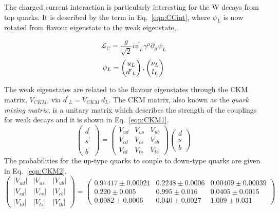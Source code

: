 The charged current interaction is particularly interesting for the W decays from top quarks. It is described by the term in Eq.~\ref{eqn:CCint}, where $\psi_L$ is now rotated from flavour eigenstate to the weak eigenstate,.

\begin{equation}
\label{eqn:CCint}
\mathcal{L}_{C} = \frac{g}{\sqrt{2}} i\bar{\psi_{L}} \gamma^{\mu} \partial_{\mu} \psi_{L}
\end{equation}
\begin{equation*}
\psi_L = \begin{pmatrix} u_L \\ {d'}_L \end{pmatrix}, \begin{pmatrix} \nu_L \\ l_L \end{pmatrix}
\end{equation*}

The weak eigenstates are related to the flavour eigenstates through the CKM matrix, $V_{CKM}$, via ${d^{\prime}}_L = V_{CKM}~d_L$. The CKM matrix, also known as the \emph{quark mixing matrix}, is a unitary matrix which describes the strength of the couplings for weak decays and it is shown in Eq.~\ref{eqn:CKM1}. 
\begin{equation}
\label{eqn:CKM1}
{\begin{pmatrix}
d^{\prime }\\
s^{\prime }\\
b^{\prime }
\end{pmatrix}}
=
{\begin{pmatrix}
V_{ud}&V_{us}&V_{ub}\\
V_{cd}&V_{cs}&V_{cb}\\
V_{td}&V_{ts}&V_{tb}
\end{pmatrix}}
{\begin{pmatrix}d\\s\\b
\end{pmatrix}}
\end{equation}
The probabilities for the up-type quarks to couple to down-type quarks are given in Eq.~\ref{eqn:CKM2}.
\begin{equation}
\label{eqn:CKM2}
{\begin{pmatrix}
|V_{ud}|&|V_{us}|&|V_{ub}|\\|V_{cd}|&|V_{cs}|&|V_{cb}|\\|V_{td}|&|V_{ts}|&|V_{tb}|
\end{pmatrix}}
=
{\begin{pmatrix}0.97417\pm 0.00021 & 0.2248\pm 0.0006 & 0.00409\pm{0.00039}\\
0.220\pm 0.005 & 0.995\pm 0.016 & 0.0405\pm{0.0015}\\
0.0082\pm{0.0006} & 0.040\pm{0.0027}&1.009\pm0.031
\end{pmatrix}}
\end{equation}



